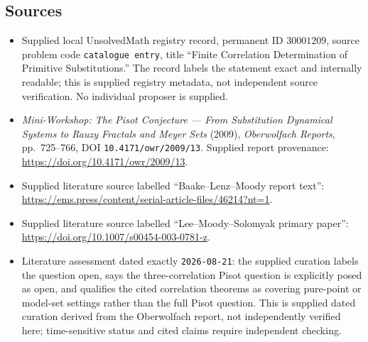 \documentclass[11pt]{article}
\begin{document}
\subsection{Sources}
\begin{itemize}
\item Supplied local UnsolvedMath registry record, permanent ID \(30001209\), source problem code \texttt{catalogue entry}, title ``Finite Correlation Determination of Primitive Substitutions.'' The record labels the statement exact and internally readable; this is supplied registry metadata, not independent source verification. No individual proposer is supplied.
\item \emph{Mini-Workshop: The Pisot Conjecture --- From Substitution Dynamical Systems to Rauzy Fractals and Meyer Sets} (2009), \emph{Oberwolfach Reports}, pp.\ 725--766, DOI \texttt{10.4171/owr/2009/13}. Supplied report provenance: \url{https://doi.org/10.4171/owr/2009/13}.
\item Supplied literature source labelled ``Baake--Lenz--Moody report text'': \url{https://ems.press/content/serial-article-files/46214?nt=1}.
\item Supplied literature source labelled ``Lee--Moody--Solomyak primary paper'': \url{https://doi.org/10.1007/s00454-003-0781-z}.
\item Literature assessment dated exactly \texttt{2026-08-21}: the supplied curation labels the question open, says the three-correlation Pisot question is explicitly posed as open, and qualifies the cited correlation theorems as covering pure-point or model-set settings rather than the full Pisot question. This is supplied dated curation derived from the Oberwolfach report, not independently verified here; time-sensitive status and cited claims require independent checking.
\end{itemize}
\end{document}
